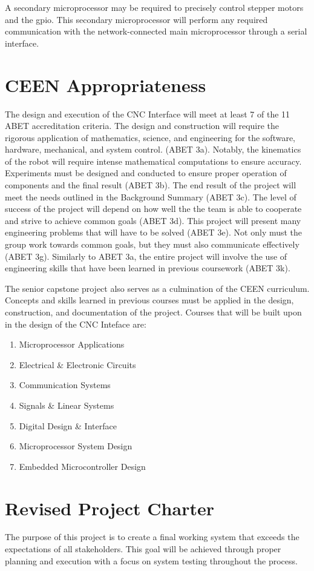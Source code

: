 A secondary microprocessor may be required to precisely control stepper motors and the \gls{gpio}.
This secondary microprocessor will perform any required communication with the network-connected main microprocessor through a serial interface. 

\section{CEEN Appropriateness}
The design and execution of the CNC Interface will meet at least 7 of the 11 ABET accreditation criteria.
The design and construction will require the rigorous application of mathematics, science, and engineering for the software, hardware, mechanical, and system control. (ABET 3a).
Notably, the kinematics of the robot will require intense mathematical computations to ensure accuracy.
Experiments must be designed and conducted to ensure proper operation of components and the final result (ABET 3b).
The end result of the project will meet the needs outlined in the Background Summary (ABET 3c).
The level of success of the project will depend on how well the the team is able to cooperate and strive to achieve common goals (ABET 3d).
This project will present many engineering problems that will have to be solved (ABET 3e).
Not only must the group work towards common goals, but they must also communicate effectively (ABET 3g).
Similarly to ABET 3a, the entire project will involve the use of engineering skills that have been learned in previous coursework (ABET 3k).

The senior capstone project also serves as a culmination of the CEEN curriculum. Concepts and skills learned in previous courses must be applied in the design, construction, and documentation of the project.
Courses that will be built upon in the design of the CNC Inteface are:
\begin{enumerate} \parskip2pt
	\item Microprocessor Applications
	\item Electrical \& Electronic Circuits
	\item Communication Systems
	\item Signals \& Linear Systems
	\item Digital Design \& Interface
	\item Microprocessor System Design
	\item Embedded Microcontroller Design
\end{enumerate}

\section{Revised Project Charter}
The purpose of this project is to create a final working system that exceeds the expectations of all stakeholders. This goal will be achieved through proper planning and execution with a focus on system testing throughout the process.

